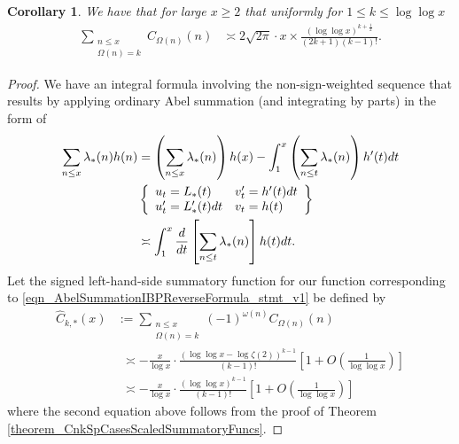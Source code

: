 \documentclass[11pt,reqno,a4letter]{article}
\numberwithin{figure}{section}
\numberwithin{table}{section}
\theoremstyle{plain}
\newtheorem{cor}[theorem]{Corollary}
\numberwithin{theorem}{section}
\theoremstyle{definition}
\begin{document}
\begin{cor} 
\label{cor_SummatoryFuncsOfUnsignedSeqs_v2} 
We have that for large $x \geq 2$ that uniformly for $1 \leq k \leq \log\log x$ 
\begin{align*} 
\sum_{\substack{n \leq x \\ \Omega(n) = k}} C_{\Omega(n)}(n) & \asymp 
     2\sqrt{2\pi} \cdot x \times 
     \frac{(\log\log x)^{k+\frac{1}{2}}}{(2k+1)(k-1)!}. 
\end{align*} 
\end{cor} 
\begin{proof} 
We have an integral formula involving the non-sign-weighted 
sequence that results by 
applying ordinary Abel summation (and integrating by parts) in the form of 
\begin{align} 
\label{eqn_AbelSummationIBPReverseFormula_stmt_v1} 
\sum_{n \leq x} \lambda_{\ast}(n) h(n) & = \left(\sum_{n \leq x} \lambda_{\ast}(n)\right) h(x) - 
     \int_{1}^{x} \left(\sum_{n \leq t} \lambda_{\ast}(n)\right) h^{\prime}(t) dt \\ 
\notag 
     & \left\{\begin{array}{ll} 
     u_t = L_{\ast}(t) & v_t^{\prime} = h^{\prime}(t) dt \\ 
     u_t^{\prime} = L_{\ast}^{\prime}(t) dt & v_t = h(t) 
     \end{array} 
     \right\} \\ 
     & \asymp 
     \int_1^{x} \frac{d}{dt}\left[\sum_{n \leq t} \lambda_{\ast}(n)\right] h(t) dt. 
\end{align} 
Let the signed left-hand-side summatory function for our function 
corresponding to \eqref{eqn_AbelSummationIBPReverseFormula_stmt_v1} be defined by 
\begin{align*} 
\widehat{C}_{k,\ast}(x) & := \sum_{\substack{n \leq x \\ \Omega(n)=k}} 
     (-1)^{\omega(n)} C_{\Omega(n)}(n) \\ 
     & \phantom{:} \asymp  
     -\frac{x}{\log x} \cdot \frac{(\log\log x - \log\zeta(2))^{k-1}}{(k-1)!} \left[ 
     1 + O\left(\frac{1}{\log\log x}\right)\right] \\ 
     & \phantom{:} \asymp 
     -\frac{x}{\log x} \cdot \frac{(\log\log x)^{k-1}}{(k-1)!} \left[ 
     1 + O\left(\frac{1}{\log\log x}\right)\right]
\end{align*} 
where the second equation above follows from the proof of 
Theorem \ref{theorem_CnkSpCasesScaledSummatoryFuncs}. 


\end{proof}
\end{document}

